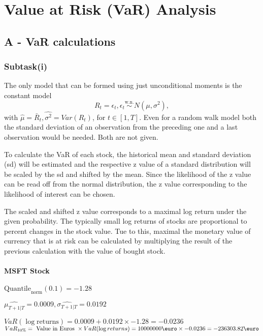 \section{Value at Risk (VaR) Analysis}
\label{sec:q2_value_at_risk_analysis}
\subsection{A - VaR calculations}

\subsubsection{Subtask(i)}

The only model that can be formed using just unconditional moments is the constant model $$R_t = \epsilon_t, \epsilon_t \overset{\text{w.n.}}{\sim} N(\mu, \sigma^2),$$
with $\hat \mu = \bar R_t, \hat{\sigma^2} = Var(R_t)$, for $t \in [1,T]$. 
Even for a random walk model both the standard deviation of an observation from the preceding one and a last observation would be needed. Both are not given.


To calculate the VaR of each stock, the historical mean and standard deviation (sd) will be estimated and the respective z value of a standard distribution will be scaled by the sd and shifted by the mean. 
Since the likelihood of the z value can be read off from the normal distribution, the z value corresponding to the likelihood of interest can be chosen.


The scaled and shifted z value corresponds to a maximal log return under the given probability. The typically small log returns of stocks are proportional to percent changes in the stock value. Tue to this, maximal the monetary value of currency that is at risk can be calculated by multiplying the result of the previous calculation with the value of bought stock.


\paragraph{MSFT Stock}


$\text{Quantile}_\text{norm}(0.1) = -1.28$

$\hat{\mu_{T+1|T}} = 0.0009, \hat{\sigma_{T+1|T}} = 0.0192$

$VaR(\log \text{returns}) = 0.0009 + 0.0192\times-1.28 = -0.0236$
$VaR_{10\%} = \text{ Value in Euros } \times VaR(\log returns) = 10 000 000 \text{\euro} \times-0.0236 = -236303.82 \text{\euro}$


